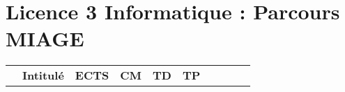 \documentclass[10pt, a5paper]{report}
\begin{document}
\vspace{0.5cm}




\section{Licence 3 Informatique : Parcours MIAGE}

\renewcommand{\arraystretch}{1.2}%
\begin{tabular}{c|m{6cm}|cm{1cm}|cm{1cm}|cm{1cm}|cm{1cm}|}
\cline{2-6}

&
\cellcolor{couleurFonce} \color{white}\bfseries Intitul\'e & \cellcolor{couleurFonce} \color{white}\bfseries ECTS & \cellcolor{couleurFonce} \color{white}\bfseries CM & \cellcolor{couleurFonce} \color{white}\bfseries TD & \cellcolor{couleurFonce} \color{white}\bfseries TP\\ \cline{2-6}


\end{tabular}
\end{document}
